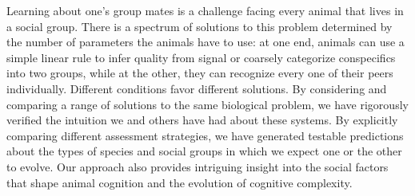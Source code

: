 Learning about one's group mates is a challenge facing every animal that lives in a social group. There is a spectrum of solutions to this problem determined by the number of parameters the animals have to use: at one end, animals can use a simple linear rule to infer quality from signal or coarsely categorize conspecifics into two groups, while at the other, they can recognize every one of their peers individually.
Different conditions favor different solutions. By considering and comparing a range of solutions to the same biological problem, we have rigorously verified the intuition we and others have had about these systems. By explicitly comparing different assessment strategies, we have generated testable predictions about the types of species and social groups in which we expect one or the other to evolve. Our approach also provides intriguing insight into the social factors that shape animal cognition and the evolution of cognitive complexity. 
\newpage



\newpage


